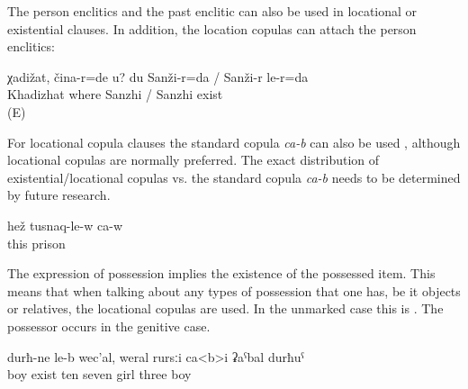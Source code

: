 The person enclitics  and the past enclitic  can also be used in locational or existential clauses. In addition, the location copulas can attach the person enclitics:
%
\begin{exe}
	\ex	\label{ex:‎Khadizhat, where are you? I am in Sanzhi}
	\gll	χadižat,	čina-r=de	u?	du	Sanži-r=da	/	Sanži-r	le-r=da\\
		Khadizhat	where			Sanzhi	/ Sanzhi exist\\
	\glt	{} (E)
\end{exe}

For locational copula clauses the standard copula \textit{ca-b} can also be used , although locational copulas are normally preferred. The exact distribution of existential/locational copulas vs. the standard copula \textit{ca-b} needs to be determined by future research. 

 \begin{exe}
	\ex	\label{ex:‎He is in prison}
	\gll	hež	tusnaq-le-w	ca-w\\
		this	prison	\\
	\glt	{}
\end{exe}

 
The expression of possession implies the existence of the possessed item. This means that when talking about any types of possession that one has, be it objects or relatives, the locational copulas are used. In the unmarked case this is  . The possessor occurs in the genitive case.
%
\begin{exe}
	\ex	\label{ex:‎(I) have ten children; they are seven girls and three boys}
	\gll	durħ-ne	le-b	wec'al,	weral	rursːi	ca<b>i	ʡaˁbal	durħuˁ\\
		boy	exist	ten	seven	girl		three	boy\\
	\glt	{}
\end{exe}

